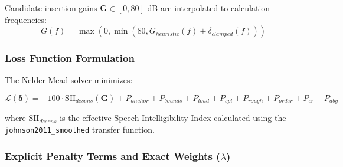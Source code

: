 \documentclass[
  12pt,
]{article}
\begin{document}
Candidate insertion gains \(\mathbf{G} \in [0, 80]\) dB are interpolated
to calculation frequencies: \begin{equation}
G(f) = \max\left(0, \min\left(80, G_{heuristic}(f) + \delta_{clamped}(f)\right)\right)
\end{equation}

\subsubsection{Loss Function
Formulation}\label{loss-function-formulation}

The Nelder-Mead solver minimizes:

\begin{equation}
\mathcal{L}(\boldsymbol{\delta}) = -100 \cdot \text{SII}_{desens}(\mathbf{G}) + P_{anchor} + P_{bounds} + P_{loud} + P_{spl} + P_{rough} + P_{order} + P_{cr} + P_{abg}
\end{equation}

where \(\text{SII}_{desens}\) is the effective Speech Intelligibility
Index calculated using the \texttt{johnson2011\_smoothed} transfer
function.

\subsubsection{\texorpdfstring{Explicit Penalty Terms and Exact Weights
(\(\lambda\))}{Explicit Penalty Terms and Exact Weights (\textbackslash lambda)}}\label{explicit-penalty-terms-and-exact-weights-lambda}
\end{document}
